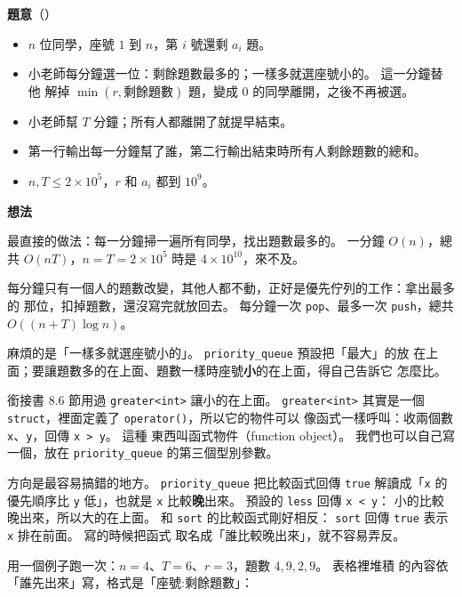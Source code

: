 \textbf{題意}（）

\begin{itemize}
\item $n$ 位同學，座號 $1$ 到 $n$，第 $i$ 號還剩 $a_i$ 題。
\item 小老師每分鐘選一位：剩餘題數最多的；一樣多就選座號小的。 這一分鐘替他
解掉 $\min(r, \text{剩餘題數})$ 題，變成 $0$ 的同學離開，之後不再被選。
\item 小老師幫 $T$ 分鐘；所有人都離開了就提早結束。
\item 第一行輸出每一分鐘幫了誰，第二行輸出結束時所有人剩餘題數的總和。
\item $n, T \le 2 \times 10^5$，$r$ 和 $a_i$ 都到 $10^9$。
\end{itemize}

\textbf{想法}

最直接的做法：每一分鐘掃一遍所有同學，找出題數最多的。 一分鐘 $O(n)$，總共
$O(nT)$，$n = T = 2 \times 10^5$ 時是 $4 \times 10^{10}$，來不及。

每分鐘只有一個人的題數改變，其他人都不動，正好是優先佇列的工作：拿出最多的
那位，扣掉題數，還沒寫完就放回去。 每分鐘一次 \texttt{pop}、最多一次
\texttt{push}，總共 $O((n + T) \log n)$。

麻煩的是「一樣多就選座號小的」。 \texttt{priority\_queue} 預設把「最大」的放
在上面；要讓題數多的在上面、題數一樣時座號\textbf{小}的在上面，得自己告訴它
怎麼比。

\begin{bridgerecap}
銜接書 8.6 節用過 \texttt{greater<int>} 讓小的在上面。 \texttt{greater<int>}
其實是一個 \texttt{struct}，裡面定義了 \texttt{operator()}，所以它的物件可以
像函式一樣呼叫：收兩個數 \texttt{x}、\texttt{y}，回傳 \texttt{x > y}。 這種
東西叫函式物件（function object）。 我們也可以自己寫一個，放在
\texttt{priority\_queue} 的第三個型別參數。

方向是最容易搞錯的地方。 \texttt{priority\_queue} 把比較函式回傳
\texttt{true} 解讀成「\texttt{x} 的優先順序比 \texttt{y} 低」，也就是
\texttt{x} 比較\textbf{晚}出來。 預設的 \texttt{less} 回傳 \texttt{x < y}：
小的比較晚出來，所以大的在上面。 和 \texttt{sort} 的比較函式剛好相反：
\texttt{sort} 回傳 \texttt{true} 表示 \texttt{x} 排在前面。 寫的時候把函式
取名成「誰比較晚出來」，就不容易弄反。
\end{bridgerecap}

用一個例子跑一次：$n = 4$、$T = 6$、$r = 3$，題數 $4, 9, 2, 9$。 表格裡堆積
的內容依「誰先出來」寫，格式是「座號:剩餘題數」：

